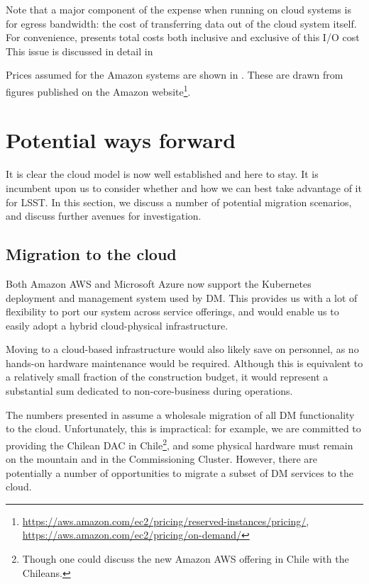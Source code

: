 Note that a major component of the expense when running on cloud systems is for egress bandwidth: the cost of transferring data out of the cloud system itself.
For convenience,  presents total costs both inclusive and exclusive of this I/O cost
This issue is discussed in detail in 



Prices assumed for the Amazon systems are shown in .
These are drawn from figures published on the Amazon website\footnote{\url{https://aws.amazon.com/ec2/pricing/reserved-instances/pricing/}, \url{https://aws.amazon.com/ec2/pricing/on-demand/}}.

\section{Potential ways forward}\label{sect:potential}

It is clear the cloud model is now well established and here to stay.
It is incumbent upon us to consider whether and how we can best take advantage of it for LSST.
In this section, we discuss a number of potential migration scenarios, and discuss further avenues for investigation.


\subsection{Migration to the cloud}\label{sect:move}

Both Amazon AWS and Microsoft Azure now support the Kubernetes deployment and management system used by DM.
This provides us with a lot of flexibility to port our system across service offerings, and would enable us to easily adopt a hybrid cloud-physical infrastructure.

Moving to a cloud-based infrastructure would also likely save on personnel, as no hands-on hardware maintenance would be required.
Although this is equivalent to a relatively small fraction of the construction budget, it would represent a substantial sum dedicated to non-core-business during operations.

The numbers presented in  assume a wholesale migration of all DM functionality to the cloud.
Unfortunately, this is impractical: for example, we are committed to providing the Chilean DAC in Chile\footnote{Though one could discuss the new Amazon AWS offering in Chile with the Chileans.}, and some physical hardware must remain on the mountain and in the Commissioning Cluster.
However, there are potentially a number of opportunities to migrate a subset of DM services to the cloud.

